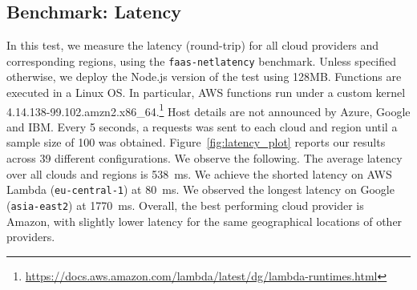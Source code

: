 \subsection{Benchmark: Latency}
In this test, we measure the latency (round-trip) for all cloud providers and corresponding regions, using the \texttt{faas-netlatency} benchmark.
Unless specified otherwise, we deploy the Node.js version of the test using 128\gls{MB}.
Functions are executed in a Linux OS.
In particular, AWS functions run under a custom kernel 4.14.138-99.102.amzn2.x86\_64.\footnote{\url{https://docs.aws.amazon.com/lambda/latest/dg/lambda-runtimes.html}} 
Host details are not announced by Azure, Google and IBM.
Every 5 seconds, a requests was sent to each cloud and region until a sample size of 100 was obtained. 
Figure~\ref{fig:latency_plot} reports our results across 39 different configurations. 
We observe the following.
The average latency over all clouds and regions is 538~ms.
We achieve the shorted latency on AWS Lambda (\texttt{eu-central-1}) at 80~ms.
We observed the longest latency on Google (\texttt{asia-east2}) at 1770~ms. 
Overall, the best performing cloud provider is Amazon, with slightly lower latency for the same geographical locations of other providers.

